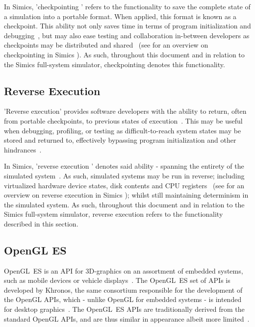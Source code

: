 In Simics, 'checkpointing ' refers to the functionality to save the complete state of a simulation into a portable format.
When applied, this format is known as a checkpoint.
This ability not only  saves time in terms of program initialization and debugging~, but may also ease testing and collaboration in-between developers as checkpoints may be distributed and shared~ (see  for an overview on checkpointing in Simics ).
As such, throughout this document and in relation to the Simics full-system simulator, checkpointing denotes this functionality.

\subsection{Reverse Execution}
\label{sec:simics_reverseexecution}
'Reverse execution' provides software developers with the ability to return, often from portable checkpoints, to previous states of execution~.
This may be useful when debugging, profiling, or testing as difficult-to-reach system states may be stored and returned to, effectively bypassing program initialization and other hindrances~.

In Simics, 'reverse execution ' denotes said ability - spanning the entirety of the simulated system~.
As such, simulated systems may be run in reverse; including virtualized hardware device states, disk contents and CPU registers~ (see  for an overview on reverse execution in Simics ); whilst still maintaining determinism in the simulated system.
As such, throughout this document and in relation to the Simics full-system simulator, reverse execution refers to the functionality described in this section.

\subsection{OpenGL ES}
\label{sec:backgroundandrelatedwork_opengles}
OpenGL~ES is an API for 3D-graphics on an assortment of embedded systems, such as mobile devices or vehicle displays~.
The OpenGL~ES set of APIs is developed by Khronos, the same consortium responsible for the development of the OpenGL APIs, which - unlike OpenGL for embedded systems - is intended for desktop graphics~.
The OpenGL~ES APIs are traditionally derived from the standard OpenGL APIs, and are thus similar in appearance albeit more limited~.

